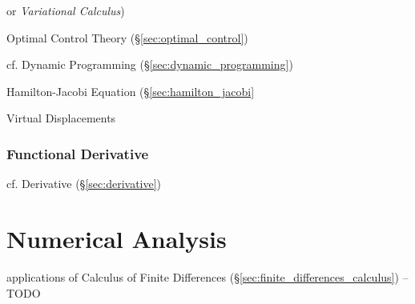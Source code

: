 or \emph{Variational Calculus})

\fist Optimal Control Theory (\S\ref{sec:optimal_control})

\fist cf. Dynamic Programming (\S\ref{sec:dynamic_programming})

Hamilton-Jacobi Equation (\S\ref{sec:hamilton_jacobi}

Virtual Displacements



\subsubsection{Functional Derivative}\label{sec:functional_derivative}

\fist cf. Derivative (\S\ref{sec:derivative})



\section{Numerical Analysis}\label{sec:numerical_analysis}

applications of Calculus of Finite Differences
(\S\ref{sec:finite_differences_calculus}) --TODO


